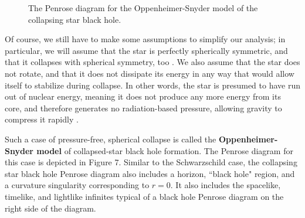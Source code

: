 \documentclass{article}
\begin{document}
\begin{wrapfigure}{r}{0.4\textwidth}
\begin{center}
\end{center}


\vspace{-60pt}
\caption{The Penrose diagram for the Oppenheimer-Snyder model of the collapsing star black hole.}
\label{fig:penrose_collapsing_star}

\end{wrapfigure}

Of course, we still have to make some assumptions to simplify our analysis; in particular, we will assume that the star is perfectly spherically symmetric, and that it collapses with spherical symmetry, too \cite{O_S_blackhole}. We also assume that the star does not rotate, and that it does not dissipate its energy in any way that would allow itself to stabilize during collapse. In other words, the star is presumed to have run out of nuclear energy, meaning it does not produce any more energy from its core, and therefore generates no radiation-based pressure, allowing gravity to compress it rapidly \cite{O_S_blackhole}.

Such a case of pressure-free, spherical collapse is called the \textbf{Oppenheimer-Snyder model} of collapsed-star black hole formation. The Penrose diagram for this case is depicted in Figure 7. Similar to the Schwarzschild case, the collapsing star black hole Penrose diagram also includes a horizon, ``black hole" region, and a curvature singularity corresponding to $r=0$. It also includes the spacelike, timelike, and lightlike infinites typical of a black hole Penrose diagram on the right side of the diagram.
\end{document}
